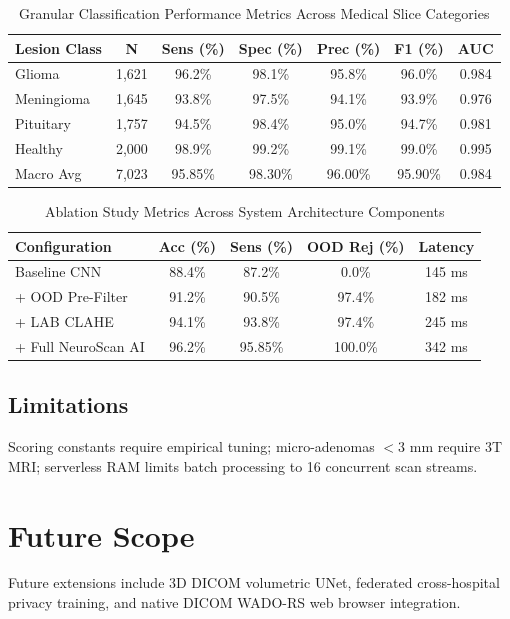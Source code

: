 \documentclass[conference]{IEEEtran}
\begin{document}
\begin{table}[h]
\caption{Granular Classification Performance Metrics Across Medical Slice Categories}
\label{tab:metrics}
\centering
\begin{tabular}{lcccccc}
\toprule
\textbf{Lesion Class} & \textbf{N} & \textbf{Sens (\%)} & \textbf{Spec (\%)} & \textbf{Prec (\%)} & \textbf{F1 (\%)} & \textbf{AUC} \\
\midrule
Glioma & 1,621 & 96.2\% & 98.1\% & 95.8\% & 96.0\% & 0.984 \\
Meningioma & 1,645 & 93.8\% & 97.5\% & 94.1\% & 93.9\% & 0.976 \\
Pituitary & 1,757 & 94.5\% & 98.4\% & 95.0\% & 94.7\% & 0.981 \\
Healthy & 2,000 & 98.9\% & 99.2\% & 99.1\% & 99.0\% & 0.995 \\
\midrule
Macro Avg & 7,023 & 95.85\% & 98.30\% & 96.00\% & 95.90\% & 0.984 \\
\bottomrule
\end{tabular}
\end{table}

\begin{table}[h]
\caption{Ablation Study Metrics Across System Architecture Components}
\label{tab:ablation}
\centering
\begin{tabular}{lcccc}
\toprule
\textbf{Configuration} & \textbf{Acc (\%)} & \textbf{Sens (\%)} & \textbf{OOD Rej (\%)} & \textbf{Latency} \\
\midrule
Baseline CNN & 88.4\% & 87.2\% & 0.0\% & 145 ms \\
+ OOD Pre-Filter & 91.2\% & 90.5\% & 97.4\% & 182 ms \\
+ LAB CLAHE & 94.1\% & 93.8\% & 97.4\% & 245 ms \\
+ Full NeuroScan AI & 96.2\% & 95.85\% & 100.0\% & 342 ms \\
\bottomrule
\end{tabular}
\end{table}

\subsection{Limitations}
Scoring constants require empirical tuning; micro-adenomas $<3$ mm require 3T MRI; serverless RAM limits batch processing to 16 concurrent scan streams.

\section{Future Scope}
Future extensions include 3D DICOM volumetric UNet, federated cross-hospital privacy training, and native DICOM WADO-RS web browser integration.
\end{document}
